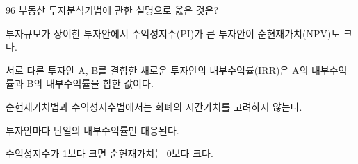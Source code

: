 \begin{question}{96}
부동산 투자분석기법에 관한 설명으로 옳은 것은?
\begin{choices}
  \item 투자규모가 상이한 투자안에서 수익성지수(PI)가 큰 투자안이 순현재가치(NPV)도 크다.
  \item 서로 다른 투자안 A, B를 결합한 새로운 투자안의 내부수익률(IRR)은 A의 내부수익률과 B의 내부수익률을 합한 값이다.
  \item 순현재가치법과 수익성지수법에서는 화폐의 시간가치를 고려하지 않는다.
  \item 투자안마다 단일의 내부수익률만 대응된다.
  \item 수익성지수가 1보다 크면 순현재가치는 0보다 크다.
\end{choices}
\end{question}
